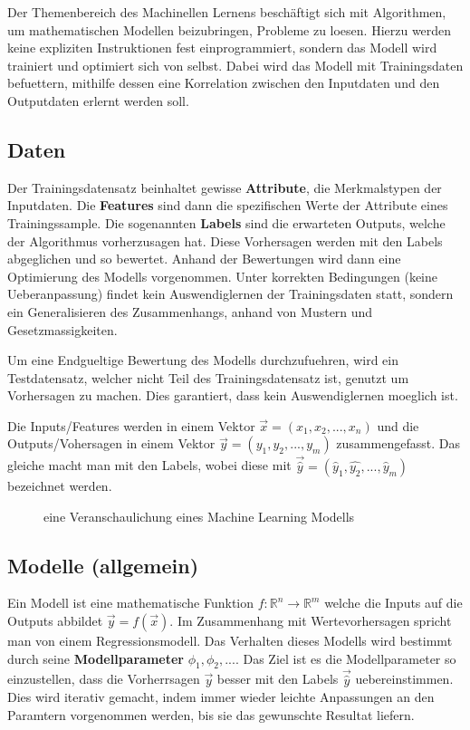 \documentclass[../main]{subfiles}
\begin{document}
Der Themenbereich des Machinellen Lernens beschäftigt sich mit Algorithmen, um mathematischen Modellen beizubringen, Probleme zu loesen.
Hierzu werden keine expliziten Instruktionen fest einprogrammiert, sondern das Modell wird trainiert und optimiert sich von selbst.
Dabei wird das Modell mit Trainingsdaten befuettern, mithilfe dessen eine Korrelation zwischen den Inputdaten und den Outputdaten erlernt werden soll.

\subsection{Daten}

Der Trainingsdatensatz beinhaltet gewisse \textbf{Attribute}, die Merkmalstypen der Inputdaten.
Die \textbf{Features} sind dann die spezifischen Werte der Attribute eines Trainingssample.
Die sogenannten \textbf{Labels} sind die erwarteten Outputs, welche der Algorithmus vorherzusagen hat.
Diese Vorhersagen werden mit den Labels abgeglichen und so bewertet.
Anhand der Bewertungen wird dann eine Optimierung des Modells vorgenommen.
Unter korrekten Bedingungen (keine Ueberanpassung) findet kein Auswendiglernen der Trainingsdaten statt,
sondern ein Generalisieren des Zusammenhangs, anhand von Mustern und Gesetzmassigkeiten.

Um eine Endgueltige Bewertung des Modells durchzufuehren, wird ein Testdatensatz, welcher nicht Teil des Trainingsdatensatz ist, genutzt um Vorhersagen zu machen.
Dies garantiert, dass kein Auswendiglernen moeglich ist.

Die Inputs/Features werden in einem Vektor $\vec{x}=(x_1,x_2,...,x_n)$ und die Outputs/Vohersagen in einem Vektor $\vec{y}=(y_1,y_2,...,y_m)$ zusammengefasst.
Das gleiche macht man mit den Labels, wobei diese mit $\vec{\hat{y}}=(\hat{y}_1,\hat{y_2},...,\hat{y}_m)$ bezeichnet werden.


\begin{figure}[h!]
    \centering
    \begin{tikzpicture}[node distance=5cm,auto]
        
    \end{tikzpicture}
    
    \caption{eine Veranschaulichung eines Machine Learning Modells}
\end{figure}

\subsection{Modelle (allgemein)}
Ein Modell ist eine mathematische Funktion $\mathit{f}\colon \mathbb{R}^n \to \mathbb{R}^m$ welche die Inputs auf die Outputs abbildet $\vec{y}=\mathit{f}(\vec{x})$.
Im Zusammenhang mit Wertevorhersagen spricht man von einem Regressionsmodell.
Das Verhalten dieses Modells wird bestimmt durch seine \textbf{Modellparameter} $\phi_1, \phi_2, ...$.
Das Ziel ist es die Modellparameter so einzustellen, dass die Vorherrsagen $\vec{y}$ besser mit den Labels $\vec{\hat{y}}$ uebereinstimmen.
Dies wird iterativ gemacht, indem immer wieder leichte Anpassungen an den Paramtern vorgenommen werden, bis sie das gewunschte Resultat liefern. 
\end{document}
